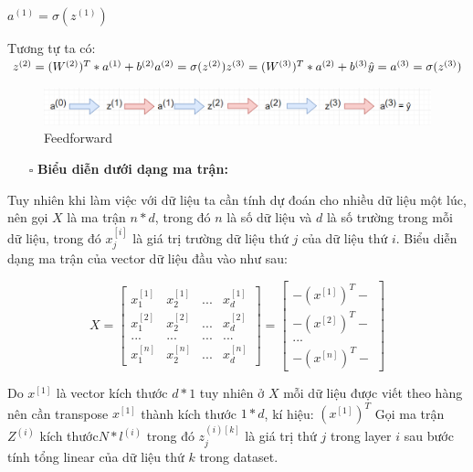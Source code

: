 $a^{(1)} =  \sigma (z^{(1)})$

Tương tự ta có:
$\newline z^{(2)} = (W^{(2)})^T * a^{(1)} + b^{(2)}\newline  a^{(2)} = \sigma(z^{(2)}) \newline z^{(3)} = (W^{(3)})^T * a^{(2)} + b^{(3)}\newline  \hat{y} = a^{(3)} = \sigma(z^{(3)})$

\FloatBarrier
\begin{figure}[htp]
\begin{center}
\includegraphics[scale=0.75]{chap2/c2_figs/ff.png}
\end{center}
\caption{Feedforward}
\label{fig:feed_forward}
\end{figure}
\FloatBarrier

\begin{itemize}
\item[$\square$] \textbf{Biểu diễn dưới dạng ma trận:}
\end{itemize}
Tuy nhiên khi làm việc với dữ liệu ta cần tính dự đoán cho nhiều dữ liệu một lúc, nên gọi $X$ là ma trận $n*d$, trong đó $n$ là số dữ liệu và $d$ là số trường trong mỗi dữ liệu, trong đó $x_j^{[i]}$ là giá trị trường dữ liệu thứ $j$ của dữ liệu thứ $i$.
Biểu diễn dạng ma trận của vector dữ liệu đầu vào như sau:

$$X = \begin{bmatrix}x_{1}^{[1]}&x_{2}^{[1]}&...&x_{d}^{[1]}\\x_{1}^{[2]}&x_{2}^{[2]}&...&x_{d}^{[2]}\\...&...&...&...\\x_{1}^{[n]}&x_{2}^{[n]}&...&x_{d}^{[n]}\end{bmatrix} =  \begin{bmatrix}-(x^{[1]})^{T}-\\-(x^{[2]})^{T}-\\...\\-(x^{[n]})^{T}-\end{bmatrix} $$

Do $x^{[1]}$ là vector kích thước $d*1$ tuy nhiên ở $X$ mỗi dữ liệu được viết theo hàng nên cần transpose $x^{[1]}$ thành kích thước $1*d$, kí hiệu: $(x^{[1]})^T$
Gọi ma trận $Z^{(i)}$ kích thước$ N*l^{(i)}$ trong đó $z_{j}^{(i)[k]}$ là giá trị thứ $j$ trong layer $i$ sau bước tính tổng linear của dữ liệu thứ $k$ trong dataset.

